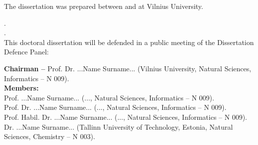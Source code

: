 \newpage
\thispagestyle{empty}                   %

\noindent\nohyphens{The dissertation was prepared between {\thesisPreparationStartYear} and {\thesisYear} at Vilnius University.}

\vspace{1cm}

.\\
.\\ %

\vspace{1cm}
\noindent
This doctoral dissertation will be defended in a public meeting of the Dissertation Defence Panel:

\vspace{0.5cm}
\noindent
{\bf Chairman  --} {{Prof. Dr. ...Name Surname...} (Vilnius University, Natural Sciences, Informatics -- N 009)}.\\ %
{\bf Members:}\\ %
{Prof. ...Name Surname...}
(..., Natural Sciences, Informatics -- N 009).\\%
{Prof. Dr. ...Name Surname...}
(..., Natural Sciences, Informatics -- N 009).\\
{Prof. Habil. Dr. ...Name Surname...} 
(..., Natural Sciences, Informatics -- N 009).\\
{Dr. ...Name Surname...}
(Tallinn University of Technology, Estonia, Natural Sciences, Chemistry -- N 003).\\

